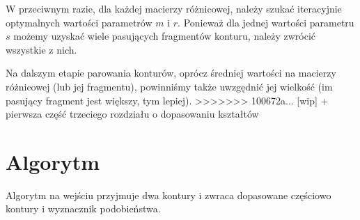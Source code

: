 W przeciwnym razie, dla każdej macierzy różnicowej, należy szukać iteracyjnie
optymalnych wartości parametrów $m$ i $r$. Ponieważ dla jednej wartości
parametru $s$ możemy uzyskać wiele pasujących fragmentów konturu, należy
zwrócić wszystkie z nich.

Na dalszym etapie parowania konturów, oprócz średniej wartości na macierzy
różnicowej (lub jej fragmentu), powinniśmy także uwzgędnić jej wielkość (im
pasujący fragment jest większy, tym lepiej).
>>>>>>> 100672a... [wip] + pierwsza część trzeciego rozdziału o dopasowaniu kształtów


\section{Algorytm}

Algorytm na wejściu przyjmuje dwa kontury i zwraca dopasowane częściowo kontury i wyznacznik podobieństwa.
